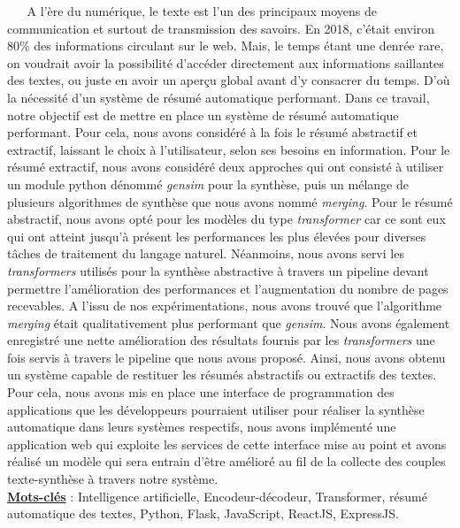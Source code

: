 $ _{} $ $ _{} $ $ _{} $ $ _{} $ $ _{} $A l'ère du numérique, le texte est l'un des principaux moyens de communication et surtout de transmission des savoirs. En 2018, c'était environ $ 80\% $ des informations circulant sur le web. Mais, le temps étant une denrée rare, on voudrait avoir la possibilité d'accéder directement aux informations saillantes des textes, ou juste en avoir un aperçu global avant d'y consacrer du temps. D'où la nécessité d'un système de résumé automatique performant.
Dans ce travail, notre objectif est de mettre en place un système de résumé automatique performant. Pour cela, nous avons considéré à la fois le résumé abstractif et extractif, laissant le choix à l'utilisateur, selon ses besoins en information.
Pour le résumé extractif, nous avons considéré deux approches qui ont consisté à utiliser un module python dénommé \textit{gensim} pour la synthèse, puis un mélange de plusieurs algorithmes de synthèse que nous avons nommé \textit{merging}. Pour le résumé abstractif, nous avons opté pour les modèles du type \textit{transformer} car ce sont eux qui ont atteint jusqu'à présent les performances les plus élevées pour diverses tâches de traitement du langage naturel. Néanmoins, nous avons servi les \textit{transformers} utilisés pour la synthèse abstractive à travers un pipeline devant permettre l'amélioration des performances et l'augmentation du nombre de pages recevables.
A l'issu de nos expérimentations, nous avons trouvé que l'algorithme \textit{merging} était qualitativement plus performant que \textit{gensim}. Nous avons également enregistré une nette amélioration des résultats fournis par les \textit{transformers} une fois servis à travers le pipeline que nous avons proposé.
Ainsi, nous avons obtenu un système capable de restituer les résumés abstractifs ou extractifs des textes. Pour cela, nous avons mis en place une interface de pro\-gram\-ma\-tion des ap\-pli\-ca\-tions que les développeurs pourraient utiliser pour réaliser la syn\-thè\-se au\-to\-ma\-ti\-que dans leurs systèmes respectifs, nous avons im\-plé\-men\-té une application web qui exploite les services de cette interface mise au point et avons réalisé un modèle qui sera entrain d'être amélioré au fil de la collecte des couples texte-synthèse à travers notre système.\\
\underline{\textbf{Mots-clés}} : Intelligence artificielle, Encodeur-décodeur, Transformer, résumé automatique des textes, Python, Flask, JavaScript, ReactJS, ExpressJS.